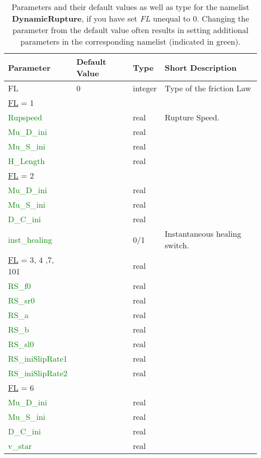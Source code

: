\documentclass[12pt,twoside]{article}
\begin{document}
\begin{table}[H]
\caption{Parameters and their default values as well as type for the namelist \textbf{DynamicRupture},
         if you have set \textit{FL} unequal to 0.
         Changing the parameter from the default value often results in setting additional parameters 
         in the corresponding namelist (indicated in green).}
\begin{center}
\begin{tabular}{|p{4.8cm}|p{2.4cm}|p{2cm}|p{5cm}|}
\hline
Parameter & Default Value & Type & Short Description \\
\hline
\hline
FL & 0 & integer & Type of the friction Law\\
\hdashline
\uline{FL} = 1 & & &\\
\textcolor{green}{Rupspeed} & & real & Rupture Speed. \\
\textcolor{green}{Mu\_D\_ini} & &  real & \\
\textcolor{green}{Mu\_S\_ini} & &  real & \\
\textcolor{green}{H\_Length} & & real  & \\
\hdashline
\uline{FL} = 2 & & &\\
\textcolor{green}{Mu\_D\_ini} & & real  & \\
\textcolor{green}{Mu\_S\_ini} & & real  & \\
\textcolor{green}{D\_C\_ini} & &  real & \\
\textcolor{green}{inst\_healing} & & 0/1 & Instantaneous healing switch. \\
\hdashline
\uline{FL} = 3, 4 ,7, 101 & &real  &\\
\textcolor{green}{RS\_f0} & &  real & \\
\textcolor{green}{RS\_sr0} & & real  & \\
\textcolor{green}{RS\_a} & &  real & \\
\textcolor{green}{RS\_b} & &  real & \\
\textcolor{green}{RS\_sl0} & & real  & \\
\textcolor{green}{RS\_iniSlipRate1} & &  real & \\
\textcolor{green}{RS\_iniSlipRate2} & & real  & \\
\hdashline
\uline{FL} = 6 & & &\\
\textcolor{green}{Mu\_D\_ini} & & real & \\
\textcolor{green}{Mu\_S\_ini} & &real  & \\
\textcolor{green}{D\_C\_ini} & & real & \\
\textcolor{green}{v\_star} & & real & \\

\end{tabular}
\end{center}
\end{table}
\end{document}
